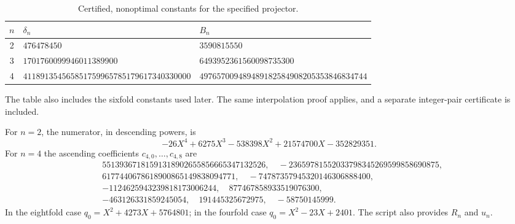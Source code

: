 \documentclass[11pt,a4paper]{article}
\theoremstyle{definition}\newtheorem{definition}[theorem]{Definition}
\theoremstyle{remark}\newtheorem{remark}[theorem]{Remark}
\begin{document}
\begin{table}[htbp]\centering\footnotesize
\begin{tabular}{c p{63mm} p{63mm}}
\toprule $n$ & $\delta_n$ & $B_n$\\\midrule
2 & $476478450$ & $3590815550$\\[4pt]
3 & $1701760099946011389900$ & $6493952361560098735300$\\[4pt]
4 & $411891354565851759965785179617340330000$ & $497657009489489182584908205353846834744$\\
\bottomrule
\end{tabular}
\caption{Certified, nonoptimal constants for the specified projector.}\label{tab:projectors}
\end{table}

The table also includes the sixfold constants used later. The same interpolation proof applies, and a separate integer-pair certificate is included.

For $n=2$, the numerator, in descending powers, is
\[
 -26X^4+6275X^3-538398X^2+21574700X-352829351.
\]
For $n=4$ the ascending coefficients $c_{4,0},\ldots,c_{4,8}$ are
\begin{align*}
&55139367181591318902655856665347132526,\quad
-23659781552033798345269599858690875,\\
&6177440678618900865149838094771,\quad
-74787357945320146306888400,\\
&-1124625943239818173006244,\quad877467858933519076300,\\
&-463126331859245054,\quad191445325672975,\quad-58750145999.
\end{align*}
In the eightfold case $q_0=X^2+4273X+5764801$; in the fourfold case $q_0=X^2-23X+2401$. The script also provides $R_n$ and $u_n$.
\end{document}
